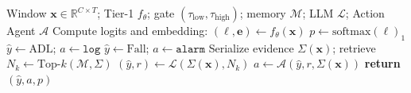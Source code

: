 \begin{algorithm}[!t]
\caption{RCDP inference for one IMU window}
\label{alg:rcdp}
\begin{algorithmic}[1]
\REQUIRE Window $\mathbf{x}\in\mathbb{R}^{C\times T}$; Tier-1 $f_\theta$; gate $(\tau_{\mathrm{low}},\tau_{\mathrm{high}})$; memory $\mathcal{M}$; LLM $\mathcal{L}$; Action Agent $\mathcal{A}$
\STATE Compute logits and embedding: $(\boldsymbol{\ell},\mathbf{e})\leftarrow f_\theta(\mathbf{x})$
\STATE $p\leftarrow \mathrm{softmax}(\boldsymbol{\ell})_1$ 
  \STATE $\hat{y}\leftarrow\mathrm{ADL}$; $a\leftarrow\texttt{log}$
  \STATE $\hat{y}\leftarrow\mathrm{Fall}$; $a\leftarrow\texttt{alarm}$
\ELSE
  \STATE Serialize evidence $\Sigma(\mathbf{x})$; retrieve $N_k\leftarrow\mathrm{Top}\text{-}k(\mathcal{M},\Sigma)$
  \STATE $(\hat{y},r)\leftarrow\mathcal{L}(\Sigma(\mathbf{x}),N_k)$ 
  \STATE $a\leftarrow\mathcal{A}(\hat{y},r,\Sigma(\mathbf{x}))$ 
\ENDIF
\STATE \textbf{return} $(\hat{y},a,p)$
\end{algorithmic}
\end{algorithm}
